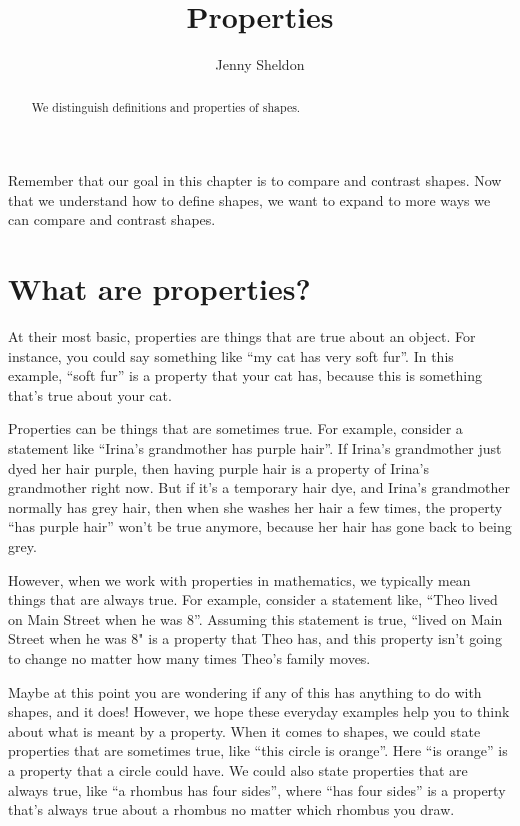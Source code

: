 \documentclass{ximera}
\title{Properties}
\author{Jenny Sheldon}
\begin{document}
\begin{abstract}
We distinguish definitions and properties of shapes.
\end{abstract}
\maketitle

Remember that our goal in this chapter is to compare and contrast shapes. Now that we understand how to define shapes, we want to expand to more ways we can compare and contrast shapes.

\section{What are properties?}

At their most basic, properties are things that are true about an object. For instance, you could say something like ``my cat has very soft fur''. In this example, ``soft fur'' is a property that your cat has, because this is something that's true about your cat. 

Properties can be things that are sometimes true. For example, consider a statement like ``Irina's grandmother has purple hair''. If Irina's grandmother just dyed her hair purple, then having purple hair is a property of Irina's grandmother right now. But if it's a temporary hair dye, and Irina's grandmother normally has grey hair, then when she washes her hair a few times, the property ``has purple hair'' won't be true anymore, because her hair has gone back to being grey.

However, when we work with properties in mathematics, we typically mean things that are always true. For example, consider a statement like, ``Theo lived on Main Street when he was 8''. Assuming this statement is true, ``lived on Main Street when he was 8" is a property that Theo has, and this property isn't going to change no matter how many times Theo's family moves.

Maybe at this point you are wondering if any of this has anything to do with shapes, and it does! However, we hope these everyday examples help you to think about what is meant by a property. When it comes to shapes, we could state properties that are sometimes true, like ``this circle is orange''. Here ``is orange'' is a property that a circle could have. We could also state properties that are always true, like ``a rhombus has four sides'', where ``has four sides'' is a property that's always true about a rhombus no matter which rhombus you draw.
\end{document}
